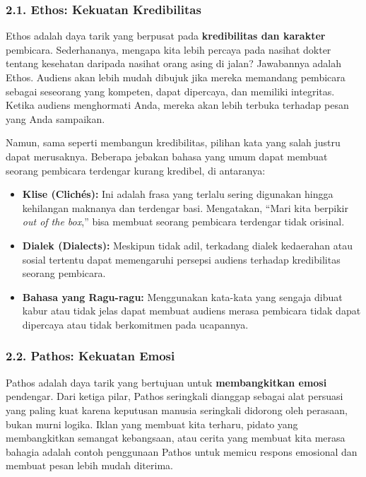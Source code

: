 \documentclass[
  letterpaper,
  DIV=11,
  numbers=noendperiod]{scrreprt}
\begin{document}
\subsubsection{2.1. Ethos: Kekuatan
Kredibilitas}\label{ethos-kekuatan-kredibilitas}

Ethos adalah daya tarik yang berpusat pada \textbf{kredibilitas dan
karakter} pembicara. Sederhananya, mengapa kita lebih percaya pada
nasihat dokter tentang kesehatan daripada nasihat orang asing di jalan?
Jawabannya adalah Ethos. Audiens akan lebih mudah dibujuk jika mereka
memandang pembicara sebagai seseorang yang kompeten, dapat dipercaya,
dan memiliki integritas. Ketika audiens menghormati Anda, mereka akan
lebih terbuka terhadap pesan yang Anda sampaikan.

Namun, sama seperti membangun kredibilitas, pilihan kata yang salah
justru dapat merusaknya. Beberapa jebakan bahasa yang umum dapat membuat
seorang pembicara terdengar kurang kredibel, di antaranya:

\begin{itemize}
\item
  \textbf{Klise (Clichés):} Ini adalah frasa yang terlalu sering
  digunakan hingga kehilangan maknanya dan terdengar basi. Mengatakan,
  ``Mari kita berpikir \emph{out of the box},'' bisa membuat seorang
  pembicara terdengar tidak orisinal.
\item
  \textbf{Dialek (Dialects):} Meskipun tidak adil, terkadang dialek
  kedaerahan atau sosial tertentu dapat memengaruhi persepsi audiens
  terhadap kredibilitas seorang pembicara.
\item
  \textbf{Bahasa yang Ragu-ragu:} Menggunakan kata-kata yang sengaja
  dibuat kabur atau tidak jelas dapat membuat audiens merasa pembicara
  tidak dapat dipercaya atau tidak berkomitmen pada ucapannya.
\end{itemize}

\subsubsection{2.2. Pathos: Kekuatan Emosi}\label{pathos-kekuatan-emosi}

Pathos adalah daya tarik yang bertujuan untuk \textbf{membangkitkan
emosi} pendengar. Dari ketiga pilar, Pathos seringkali dianggap sebagai
alat persuasi yang paling kuat karena keputusan manusia seringkali
didorong oleh perasaan, bukan murni logika. Iklan yang membuat kita
terharu, pidato yang membangkitkan semangat kebangsaan, atau cerita yang
membuat kita merasa bahagia adalah contoh penggunaan Pathos untuk memicu
respons emosional dan membuat pesan lebih mudah diterima.
\end{document}
